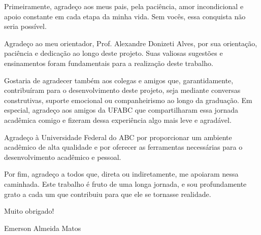 \begin{agradecimentos}

Primeiramente, agradeço aos meus pais, pela paciência, amor incondicional e apoio constante em cada etapa da minha vida. Sem vocês, essa conquista não seria possível.

Agradeço ao meu orientador, Prof. Alexandre Donizeti Alves, por sua orientação, paciência e dedicação ao longo deste projeto. Suas valiosas sugestões e ensinamentos foram fundamentais para a realização deste trabalho.

Gostaria de agradecer também aos colegas e amigos que, garantidamente, contribuíram para o desenvolvimento deste projeto, seja mediante conversas construtivas, suporte emocional ou companheirismo ao longo da graduação. Em especial, agradeço aos amigos da UFABC que compartilharam essa jornada acadêmica comigo e fizeram dessa experiência algo mais leve e agradável.

Agradeço à Universidade Federal do ABC por proporcionar um ambiente acadêmico de alta qualidade e por oferecer as ferramentas necessárias para o desenvolvimento acadêmico e pessoal.

Por fim, agradeço a todos que, direta ou indiretamente, me apoiaram nessa caminhada. Este trabalho é fruto de uma longa jornada, e sou profundamente grato a cada um que contribuiu para que ele se tornasse realidade.

Muito obrigado!

\bigskip

\begin{flushright}
Emerson Almeida Matos
\end{flushright}
\end{agradecimentos}
